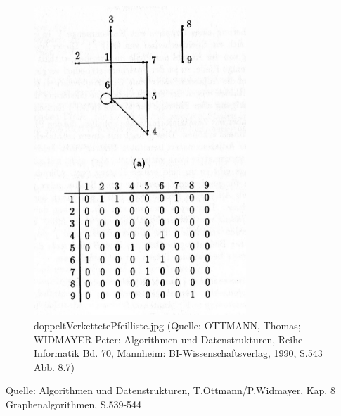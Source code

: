 \begin{figure}[h]
\centering
\includegraphics[width = 8cm]{./chapters/adjazenzmatrix.jpg}
\caption{doppeltVerkettetePfeilliste.jpg {\tiny (Quelle: OTTMANN, Thomas; WIDMAYER Peter: Algorithmen und Datenstrukturen, Reihe Informatik Bd. 70, Mannheim: BI-Wissenschaftsverlag, 1990, S.543 Abb. 8.7)} }
\label{a4}
\end{figure}

Quelle:
Algorithmen und Datenstrukturen, T.Ottmann/P.Widmayer, Kap. 8 Graphenalgorithmen, S.539-544
